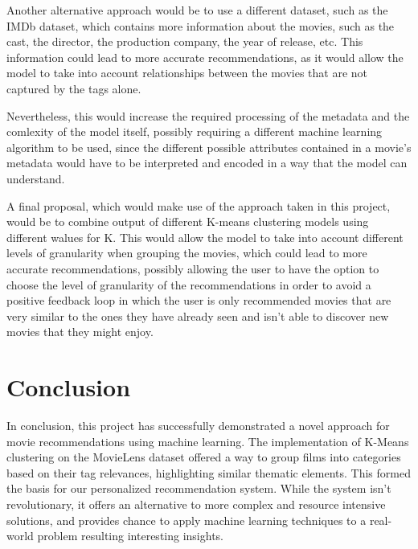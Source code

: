 Another alternative approach would be to use a different dataset, such as the IMDb dataset, which contains more information about the movies, such as the cast, the director, the production company, the year of release, etc. This information could lead to more accurate recommendations, as it would allow the model to take into account relationships between the movies that are not captured by the tags alone.

Nevertheless, this would increase the required processing of the metadata and the comlexity of the model itself, possibly requiring a different machine learning algorithm to be used, since the different possible attributes contained in a movie's metadata would have to be interpreted and encoded in a way that the model can understand.

A final proposal, which would make use of the approach taken in this project, would be to combine output of different K-means clustering models using different walues for K. This would allow the model to take into account different levels of granularity when grouping the movies, which could lead to more accurate recommendations, possibly allowing the user to have the option to choose the level of granularity of the recommendations in order to avoid a positive feedback loop in which the user is only recommended movies that are very similar to the ones they have already seen and isn't able to discover new movies that they might enjoy.

\section{Conclusion}

In conclusion, this project has successfully demonstrated a novel approach for movie recommendations using machine learning. The implementation of K-Means clustering on the MovieLens dataset offered a way to group films into categories based on their tag relevances, highlighting similar thematic elements. This formed the basis for our personalized recommendation system. While the system isn't revolutionary, it offers an alternative to more complex and resource intensive solutions, and provides chance to apply machine learning techniques to a real-world problem resulting interesting insights.